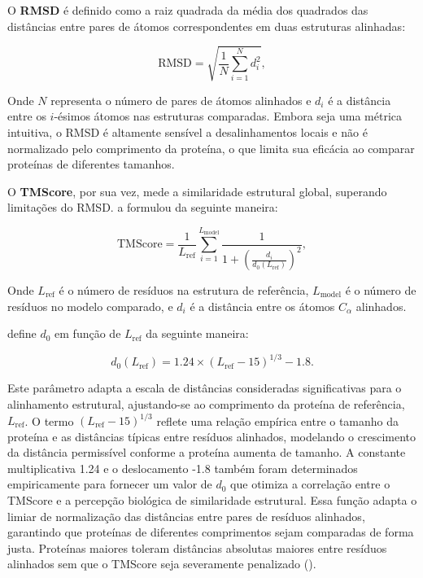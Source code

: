 O \textbf{RMSD} é definido como a raiz quadrada da média dos quadrados das distâncias 
entre pares de átomos correspondentes em duas estruturas alinhadas:

\begin{equation}
    \text{RMSD} = \sqrt{\frac{1}{N} \sum_{i=1}^{N} d_i^2},
\end{equation}

\noindent Onde \(N\) representa o número de pares de átomos alinhados e \(d_i\) é a distância entre os \(i\)-ésimos átomos nas estruturas comparadas. 
Embora seja uma métrica intuitiva, o RMSD é altamente sensível a desalinhamentos locais e não é normalizado pelo comprimento da proteína,
o que limita sua eficácia ao comparar proteínas de diferentes tamanhos.

O \textbf{TMScore}, por sua vez,
mede a similaridade estrutural global, superando limitações do RMSD. \cite{tmscore} a formulou da seguinte maneira:

\begin{equation}
    \text{TMScore} = \frac{1}{L_{\text{ref}}} \sum_{i=1}^{L_{\text{model}}} \frac{1}{1 + \left(\frac{d_i}{d_0(L_{\text{ref}})}\right)^2},
\end{equation}

\noindent Onde \(L_{\text{ref}}\) é o número de resíduos na estrutura de referência,
 \(L_{\text{model}}\) é o número de resíduos no modelo comparado, 
 e \(d_i\) é a distância entre os átomos \(C_\alpha\) alinhados. 
 
 \cite{tmscore} define \(d_0\) em função de \(L_{\text{ref}}\) da seguinte maneira:

\begin{equation}
    d_0(L_{\text{ref}}) = 1.24 \times (L_{\text{ref}} - 15)^{1/3} - 1.8.
\end{equation}

Este parâmetro adapta a escala de distâncias consideradas significativas para o alinhamento estrutural,
ajustando-se ao comprimento da proteína de referência, \( L_{\text{ref}} \). 
O termo \( (L_{\text{ref}} - 15)^{1/3} \) 
reflete uma relação empírica entre o tamanho da proteína e as distâncias típicas entre resíduos alinhados,
modelando o crescimento da distância permissível conforme a proteína aumenta de tamanho.
A constante multiplicativa 1.24 e o deslocamento -1.8 também foram determinados empiricamente para fornecer 
um valor de \( d_0 \) que otimiza a correlação entre o TMScore e a percepção biológica de similaridade estrutural.
Essa função adapta o limiar de normalização das distâncias entre pares de resíduos alinhados,
garantindo que proteínas de diferentes comprimentos sejam comparadas de forma justa.
Proteínas maiores toleram distâncias absolutas maiores entre resíduos alinhados sem que o TMScore seja severamente penalizado (\cite{tmscore}).
 

